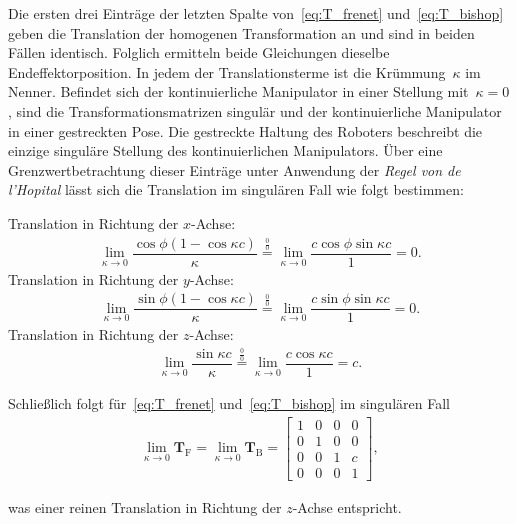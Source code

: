 Die ersten drei Einträge der letzten Spalte von~\eqref{eq:T_frenet} und~\eqref{eq:T_bishop} geben die  Translation der homogenen Transformation an und sind in beiden Fällen identisch. Folglich ermitteln beide Gleichungen dieselbe Endeffektorposition.
In jedem der Translationsterme ist die Krümmung~$\kappa$ im Nenner. Befindet sich der kontinuierliche Manipulator in einer Stellung mit~$\kappa=0$, sind die Transformationsmatrizen singulär und der kontinuierliche Manipulator in einer gestreckten Pose. Die gestreckte Haltung des Roboters beschreibt die einzige singuläre Stellung des kontinuierlichen Manipulators. Über eine Grenzwertbetrachtung dieser Einträge unter Anwendung der \textit{Regel von de l'Hopital} lässt sich die Translation im singulären Fall wie folgt bestimmen:

\vspace{0.1cm}
Translation in Richtung der \mbox{$x$-Achse}:
\begin{align*}
\lim\limits_{\kappa \to 0} \dfrac{\cos\phi (1-\cos\kappa c)}{\kappa} \stackrel{\frac{0}{0}}{=} 
\lim\limits_{\kappa \to 0} \dfrac{c\cos\phi \sin\kappa c}{1} = 0.
\end{align*}
Translation in Richtung der \mbox{$y$-Achse}:
\begin{align*}
\lim\limits_{\kappa \to 0} \dfrac{\sin\phi (1-\cos\kappa c)}{\kappa} \stackrel{\frac{0}{0}}{=}
\lim\limits_{\kappa \to 0} \dfrac{c\sin\phi \sin\kappa c}{1} = 0.
\end{align*}
Translation in Richtung der \mbox{$z$-Achse}:
\begin{align*}
\lim\limits_{\kappa \to 0} \dfrac{\sin\kappa c}{\kappa} \stackrel{\frac{0}{0}}{=}
\lim\limits_{\kappa \to 0} \dfrac{c \cos\kappa c }{1} = c.
\end{align*}

Schließlich folgt für~\eqref{eq:T_frenet} und~\eqref{eq:T_bishop}  im singulären Fall
\begin{align*}
\lim\limits_{\kappa \to 0} \bm{T}_\mathrm{F} = \lim\limits_{\kappa \to 0} \bm{T}_\mathrm{B} = 
\begin{bmatrix}
1 & 0 & 0 & 0 \\
0 & 1 & 0 & 0 \\
0 & 0 & 1 & c \\
0 & 0 & 0 & 1
\end{bmatrix},
\end{align*}

was einer reinen Translation in Richtung der $z$-Achse entspricht. \newline

